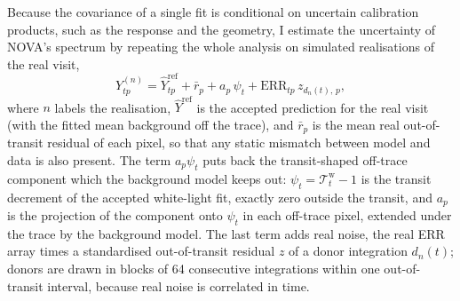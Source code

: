 Because the covariance of a single fit is conditional on uncertain
calibration products, such as the response and the geometry, I estimate the uncertainty of NOVA's spectrum by repeating the whole
analysis on simulated realisations of the real visit,
\begin{equation}
 Y^{(n)}_{tp}=\widehat Y^{\mathrm{ref}}_{tp}+\bar r_p+a_p\,\psi_t
 +\mathrm{ERR}_{tp}\,z_{d_n(t),\,p},
 \label{eq:ensemble-draw}
\end{equation}
where $n$ labels the realisation, $\widehat Y^{\mathrm{ref}}$ is the accepted
prediction for the real visit (with the fitted mean background off the
trace), and $\bar r_p$ is the mean real out-of-transit residual of each
pixel, so that any static mismatch between model and data is also present. The term $a_p\psi_t$ puts back the transit-shaped
off-trace component which the background model keeps out:
$\psi_t=\mathcal{T}^{\mathrm{w}}_t-1$ is the transit decrement of the
accepted white-light fit, exactly zero outside the transit, and $a_p$ is the
projection of the component onto $\psi_t$ in each off-trace pixel, extended
under the trace by the background model. The last term adds real noise, the
real ERR array times a standardised out-of-transit residual $z$ of a donor
integration $d_n(t)$; donors are drawn in blocks of 64 consecutive
integrations within one out-of-transit interval, because real noise is
correlated in time.

